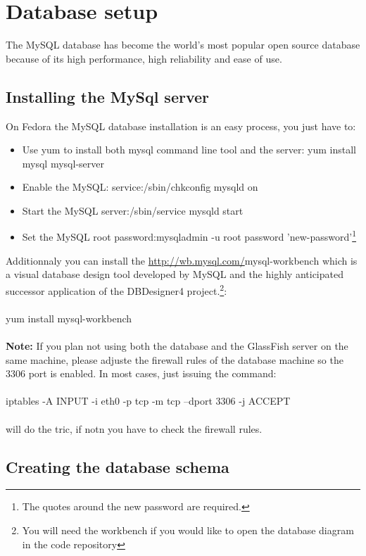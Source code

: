 
\section{Database setup}
The MySQL database has become the world's most popular open source database
because of its high performance, high reliability and ease of use.
\subsection{Installing the MySql server}
On Fedora the MySQL database installation is an easy process, you just have to:
\begin{itemize}
  \item Use yum to install both mysql command line tool and the server:
  {\Console yum install mysql mysql-server}
  \item Enable the MySQL: {\Console service:/sbin/chkconfig mysqld on}
  \item Start the MySQL server:{\Console /sbin/service mysqld start}
  \item Set the MySQL root password:{\Console mysqladmin -u root password
  'new-password'}\footnote{The quotes around the new password are required.}
\end{itemize}

Additionnaly you can install the \url{http://wb.mysql.com/}{mysql-workbench}
which is a visual database design tool developed by MySQL and the highly
anticipated successor application of the DBDesigner4 project.\footnote{You will
need the workbench if you would like to open the database diagram in the code
repository}:
\\\\
{\Console yum install mysql-workbench}
\\\\
\textbf{Note:} If you plan not using both the database and the GlassFish server
on the same machine, please adjuste the firewall rules of the database machine so
the 3306 port is enabled. In most cases, just issuing the command:
\\\\
{\Console iptables -A INPUT -i eth0 -p tcp -m tcp --dport 3306 -j ACCEPT}
\\\\
will do the tric, if notn you have to check the firewall rules.
\subsection{Creating the database schema}
